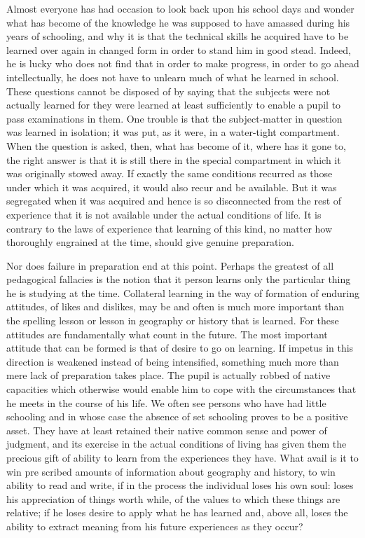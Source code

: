Almost everyone has had occasion to look back upon his school days and wonder 
what has become of the knowledge he was supposed to have amassed during his years of 
schooling, and why it is that the technical skills he acquired have to be learned over again 
in changed form in order to stand him in good stead. Indeed, he is lucky who does not 
find that in order to make progress, in order to go ahead intellectually, he does not have 
to unlearn much of what he learned in school. These questions cannot be disposed of by 
saying that the subjects were not actually learned for they were learned at least 
sufficiently to enable a pupil to pass examinations in them. One trouble is that the 
subject-matter in question was learned in isolation; it was put, as it were, in a water-tight 
compartment. When the question is asked, then, what has become of it, where has it gone 
to, the right answer is that it is still there in the special compartment in which it was 
originally stowed away. If exactly the same conditions recurred as those under which it was acquired, it would also recur and be available. But it was segregated when it was 
acquired and hence is so disconnected from the rest of experience that it is not available 
under the actual conditions of life. It is contrary to the laws of experience that learning of 
this kind, no matter how thoroughly engrained at the time, should give genuine 
preparation. 

Nor does failure in preparation end at this point. Perhaps the greatest of all 
pedagogical fallacies is the notion that it person learns only the particular thing he is 
studying at the time. Collateral learning in the way of formation of enduring attitudes, of 
likes and dislikes, may be and often is much more important than the spelling lesson or 
lesson in geography or history that is learned. For these attitudes are fundamentally what 
count in the future. The most important attitude that can be formed is that of desire to go 
on learning. If impetus in this direction is weakened instead of being intensified, 
something much more than mere lack of preparation takes place. The pupil is actually 
robbed of native capacities which otherwise would enable him to cope with the 
circumstances that he meets in the course of his life. We often see persons who have had 
little schooling and in whose case the absence of set schooling proves to be a positive 
asset. They have at least retained their native common sense and power of judgment, and 
its exercise in the actual conditions of living has given them the precious gift of ability to 
learn from the experiences they have. What avail is it to win pre scribed amounts of 
information about geography and history, to win ability to read and write, if in the 
process the individual loses his own soul: loses his appreciation of things worth while, of 
the values to which these things are relative; if he loses desire to apply what he has 
learned and, above all, loses the ability to extract meaning from his future experiences as 
they occur? 

